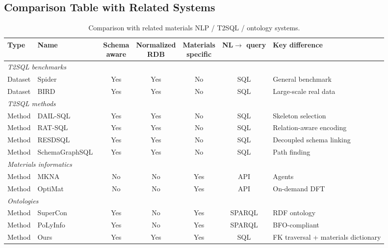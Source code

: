 \subsection{Comparison Table with Related Systems}

\begin{table}[htbp]
  \centering
  \caption{Comparison with related materials NLP / T2SQL / ontology systems.}
  \label{tab:related_comparison}
  \small
  \begin{tabularx}{\textwidth}{llccccX}
    \toprule
    Type & Name & \shortstack{Schema\\aware} & \shortstack{Normalized\\RDB} & \shortstack{Materials\\specific} & \shortstack{NL$\to$\\query} & Key difference \\
    \midrule
    \multicolumn{7}{l}{\textit{T2SQL benchmarks}} \\
    Dataset & Spider~\cite{yu2018spider} & Yes & Yes & No & SQL & General benchmark \\
    Dataset & BIRD~\cite{li2024bird} & Yes & Yes & No & SQL & Large-scale real data \\
    \midrule
    \multicolumn{7}{l}{\textit{T2SQL methods}} \\
    Method & DAIL-SQL~\cite{gao2023dail} & Yes & Yes & No & SQL & Skeleton selection \\
    Method & RAT-SQL~\cite{wang2020ratsql} & Yes & Yes & No & SQL & Relation-aware encoding \\
    Method & RESDSQL~\cite{li2023resdsql} & Yes & Yes & No & SQL & Decoupled schema linking \\
    Method & SchemaGraphSQL~\cite{safdarian2026schemagraphsql} & Yes & Yes & No & SQL & Path finding \\
    \midrule
    \multicolumn{7}{l}{\textit{Materials informatics}} \\
    Method & MKNA~\cite{zhuang2026mkna} & No & No & Yes & API & Agents \\
    Method & OptiMat~\cite{hu2026optimat} & No & No & Yes & API & On-demand DFT \\
    \midrule
    \multicolumn{7}{l}{\textit{Ontologies}} \\
    Method & SuperCon~\cite{ishii2023supercon} & Yes & No & Yes & SPARQL & RDF ontology \\
    Method & PoLyInfo~\cite{ishii2024polyinfo} & Yes & No & Yes & SPARQL & BFO-compliant \\
    \midrule
    Method & Ours & Yes & Yes & Yes & SQL & FK traversal + materials dictionary \\
    \bottomrule
  \end{tabularx}
\end{table}


